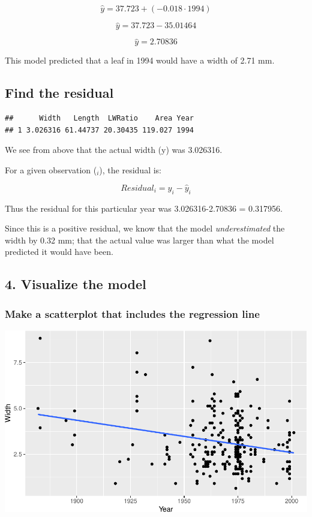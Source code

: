 \documentclass[]{article}
\begin{document}
\[ \hat{y} = 37.723 + (-0.018 \cdot 1994) \]

\[ \hat{y} = 37.723 -35.01464 \]

\[ \hat{y} = 2.70836 \]

This model predicted that a leaf in 1994 would have a width of 2.71 mm.

\hypertarget{find-the-residual}{%
\subsection{Find the residual}\label{find-the-residual}}

\begin{verbatim}
##      Width   Length  LWRatio    Area Year
## 1 3.026316 61.44737 20.30435 119.027 1994
\end{verbatim}

We see from above that the actual width (y) was 3.026316.

For a given observation (\(_i\)), the residual is:

\[ Residual_i = y_i - \hat{y}_i \]

Thus the residual for this particular year was 3.026316-2.70836 =
0.317956.

Since this is a positive residual, we know that the model
\emph{underestimated} the width by 0.32 mm; that the actual value was
larger than what the model predicted it would have been.

\hypertarget{visualize-the-model}{%
\subsection{4. Visualize the model}\label{visualize-the-model}}

\hypertarget{make-a-scatterplot-that-includes-the-regression-line}{%
\subsubsection{Make a scatterplot that includes the regression
line}\label{make-a-scatterplot-that-includes-the-regression-line}}

\includegraphics{02_Activity_AfterClass_files/figure-latex/unnamed-chunk-1-1.pdf}
\end{document}
